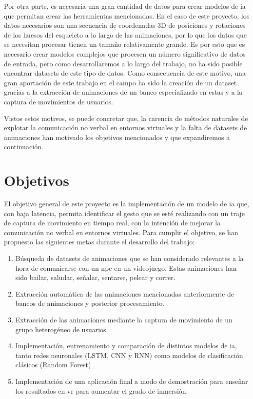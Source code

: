 Por otra parte, es necesaria una gran cantidad de datos para crear modelos de \gls{ia} que permitan crear las herramientas mencionadas.
En el caso de este proyecto, los datos necesarios son una secuencia de coordenadas 3D de posiciones y rotaciones de los huesos del esqueleto a lo largo de las animaciones, por lo que los datos que se necesitan procesar tienen un tamaño relativamente grande.
Es por esto que es necesario crear modelos complejos que procesen un número significativo de datos de entrada, pero como desarrollaremos a lo largo del trabajo, no ha sido posible encontrar datasets de este tipo de datos.
Como consecuencia de este motivo, una gran aportación de este trabajo en el campo ha sido la creación de un dataset gracias a la extracción de animaciones de un banco especializado en estas y a la captura de movimientos de usuarios.

Vistos estos motivos, se puede concretar que, la carencia de métodos naturales de explotar la comunicación no verbal en entornos virtuales y la falta de datasets de animaciones han motivado los objetivos mencionados y que expandiremos a continuación.
\section{Objetivos}
El objetivo general de este proyecto es la implementación de un modelo de \gls{ia} que, con baja latencia, permita identificar el gesto que se esté realizando con un traje de captura de movimiento en tiempo real, con la intención de mejorar la comunicación no verbal en entornos virtuales.
Para cumplir el objetivo, se han propuesto las siguientes metas durante el desarrollo del trabajo:
\begin{enumerate}
	\item Búsqueda de datasets de animaciones que se han considerado relevantes a la hora de comunicarse con un \gls{npc} en un videojuego. Estas animaciones han sido bailar, saludar, señalar, sentarse, pelear y correr.
	\item Extracción automática de las animaciones mencionadas anteriormente de bancos de animaciones y posterior procesamiento.
	\item Extracción de las animaciones mediante la captura de movimiento de un grupo heterogéneo de usuarios.
	\item Implementación, entrenamiento y comparación de distintos modelos de \gls{ia}, tanto redes neuronales (LSTM, CNN y RNN) como modelos de clasificación clásicos (Random Forest)
	\item Implementación de una aplicación final a modo de demostración para enseñar los resultados en \gls{vr} para aumentar el grado de inmersión.
\end{enumerate}


